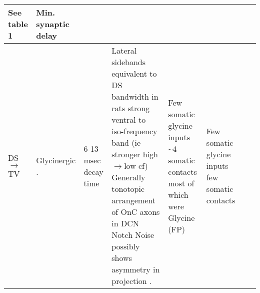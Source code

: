 \begin{longtable}{XXXXXXXX}
See table 1 \citep{SmithRhode:1989}     
& 
Min. synaptic delay 
\\ \midrule
DS\ensuremath{\rightarrow}TV                        
& %
Glycinergic \citep{DoucetRyugoEtAl:1999,OertelWuEtAl:1990,OstapoffMorestEtAl1999,SpirouDavisEtAl:1999,ZhangOertel:1993}.                                                              
& 
6-13 msec decay time \citep{AwatramaniTurecekEtAl:2005,FerragamoGoldingEtAl:1998a,HartyManis:1996,HartyManis:1998,LeaoOleskevichEtAl:2004}
                                                                          
& 
Lateral sidebands equivalent to DS bandwidth
\citep{OstapoffMorestEtAl:1999,SpirouDavisEtAl:1999} 
in rats strong ventral to iso-frequency band (ie stronger high \ensuremath{\rightarrow}low cf)
\citep{DoucetRyugoEtAl:1999,FriedlandPongstapornEtAl:2003} 
Generally tonotopic arrangement of OnC axons in DCN \citep{ArnottWallaceEtAl:2004}
Notch Noise possibly shows asymmetry in projection \citep{ReissYoung:2005}.      
& Few
somatic glycine inputs
\citep{OsenOttersenEtAl:1990,OstapoffMorestEtAl1999:1999,ZhangOertel:1993}
\~{}4 somatic contacts most of which were Glycine (FP) \citep{Alibardi:1999}
                                                                          
& 
Few somatic glycine inputs \citep{OsenOttersenEtAl:1990,OstapoffMorestEtAl:1999,ZhangOertel:1993} 
few  somatic contacts \citep{Alibardi:1999}                   


\end{longtable}
